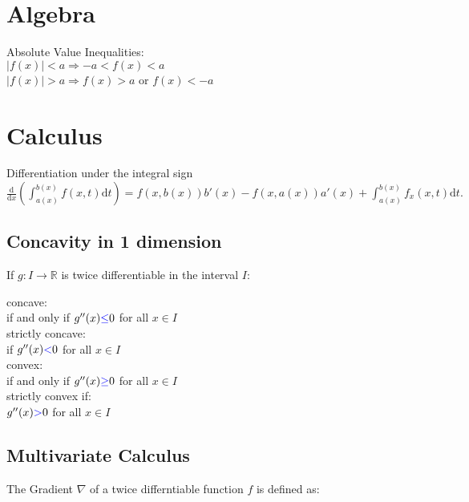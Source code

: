 \section{Algebra}
Absolute Value Inequalities:\\
$ |f(x)| < a  \Rightarrow  -a < f(x) < a$\\ 
$|f(x)| > a  \Rightarrow f(x) > a$ or $f(x) < -a$\\
\section{Calculus}

Differentiation under the integral sign\\
$\frac{\text{d}}{\text{d}x}\left( \int_{a(x)}^{b(x)}f(x,t)\text{d}t \right ) = f(x,b(x))b'(x)-f(x,a(x))a'(x)+\int_{a(x)}^{b(x)}f_x(x,t)\text{d}t.$

\subsection*{Concavity in 1 dimension}
If $g:I \to \mathbb {R}$ is twice differentiable in the interval $I$:

concave:\\ 
if and only if $g^{\prime \prime }(x) {\color{blue}{\leq }}  0$ for all $x \in I$\\

strictly concave:\\
if $g^{\prime \prime }(x) {\color{blue}{<}}  0$ for all $x \in I$\\

convex:\\ 
if and only if $g^{\prime \prime }(x) {\color{blue}{\geq }}  0$ for all $x \in I$\\

strictly convex if:\\
$g^{\prime \prime }(x) {\color{blue}{>}}  0$ for all $x \in I$\\

\subsection*{Multivariate Calculus}
The Gradient $\nabla$ of a twice differntiable function $f$ is defined as:

